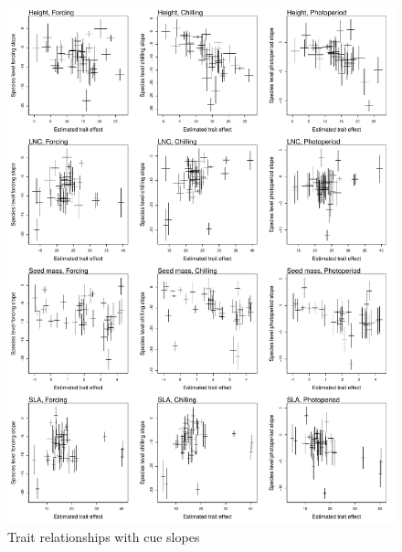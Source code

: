 \documentclass{article}\usepackage[]{graphicx}\usepackage[]{color}
\begin{document}
\begin{figure}[h!]
    \centering
 \includegraphics[width=\textwidth]{..//..//analyses/traits/figures/cuetrait.pdf} 
    \caption{Trait relationships with cue slopes}
    \label{fig:cuetraits}
\end{figure}
\end{document}
